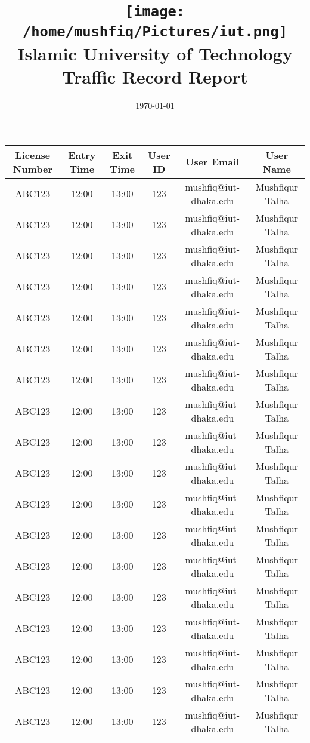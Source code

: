\documentclass[12pt,notitle]{article}
\title{\texttt{[image: /home/mushfiq/Pictures/iut.png]}\\\textbf{Islamic University of Technology}\\Traffic Record Report}
\date{\today}
\begin{document}
  \maketitle
  \begin{center}\begin{tabular}{|c|c|c|c|c|c|}
\hline
\textbf{License Number} & \textbf{Entry Time} & \textbf{Exit Time} & \textbf{User ID} & \textbf{User Email} & \textbf{User Name} \\
\hline\hline
ABC123 & 12:00 & 13:00 & 123 & mushfiq@iut-dhaka.edu & Mushfiqur Talha \\
\hline
ABC123 & 12:00 & 13:00 & 123 & mushfiq@iut-dhaka.edu & Mushfiqur Talha \\
\hline
ABC123 & 12:00 & 13:00 & 123 & mushfiq@iut-dhaka.edu & Mushfiqur Talha \\
\hline
ABC123 & 12:00 & 13:00 & 123 & mushfiq@iut-dhaka.edu & Mushfiqur Talha \\
\hline
ABC123 & 12:00 & 13:00 & 123 & mushfiq@iut-dhaka.edu & Mushfiqur Talha \\
\hline
ABC123 & 12:00 & 13:00 & 123 & mushfiq@iut-dhaka.edu & Mushfiqur Talha \\
\hline
ABC123 & 12:00 & 13:00 & 123 & mushfiq@iut-dhaka.edu & Mushfiqur Talha \\
\hline
ABC123 & 12:00 & 13:00 & 123 & mushfiq@iut-dhaka.edu & Mushfiqur Talha \\
\hline
ABC123 & 12:00 & 13:00 & 123 & mushfiq@iut-dhaka.edu & Mushfiqur Talha \\
\hline
ABC123 & 12:00 & 13:00 & 123 & mushfiq@iut-dhaka.edu & Mushfiqur Talha \\
\hline
ABC123 & 12:00 & 13:00 & 123 & mushfiq@iut-dhaka.edu & Mushfiqur Talha \\
\hline
ABC123 & 12:00 & 13:00 & 123 & mushfiq@iut-dhaka.edu & Mushfiqur Talha \\
\hline
ABC123 & 12:00 & 13:00 & 123 & mushfiq@iut-dhaka.edu & Mushfiqur Talha \\
\hline
ABC123 & 12:00 & 13:00 & 123 & mushfiq@iut-dhaka.edu & Mushfiqur Talha \\
\hline
ABC123 & 12:00 & 13:00 & 123 & mushfiq@iut-dhaka.edu & Mushfiqur Talha \\
\hline
ABC123 & 12:00 & 13:00 & 123 & mushfiq@iut-dhaka.edu & Mushfiqur Talha \\
\hline
ABC123 & 12:00 & 13:00 & 123 & mushfiq@iut-dhaka.edu & Mushfiqur Talha \\
\hline
ABC123 & 12:00 & 13:00 & 123 & mushfiq@iut-dhaka.edu & Mushfiqur Talha \\

\end{tabular}
\end{center}
\end{document}
